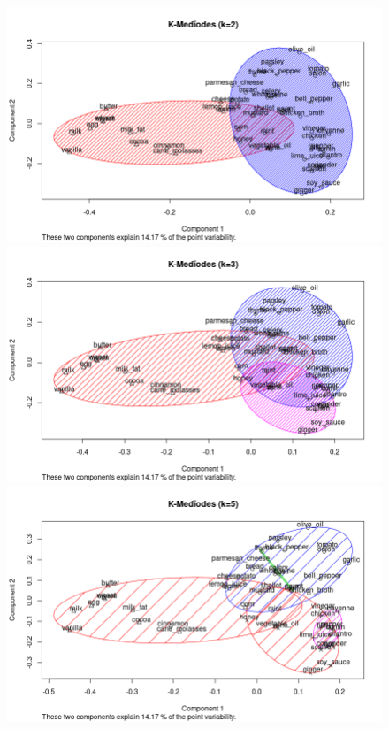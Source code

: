 \documentclass[a4paper, titlepage]{report}
\begin{document}
\begin{figure}[h]
	\begin{center}
		\includegraphics[scale = 0.45]{./doc/kmediodes-2.png}
		\includegraphics[scale = 0.45]{./doc/kmediodes-3.png}
		\includegraphics[scale = 0.45]{./doc/kmediodes-5.png}

\end{center}
\end{figure}
\end{document}
